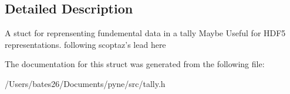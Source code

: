 \subsection{Detailed Description}
A stuct for reprensenting fundemental data in a tally Maybe Useful for H\+D\+F5 representations. following scoptaz's lead here 

The documentation for this struct was generated from the following file\+:\begin{DoxyCompactItemize}
\item 
/\+Users/bates26/\+Documents/pyne/src/tally.\+h\end{DoxyCompactItemize}
